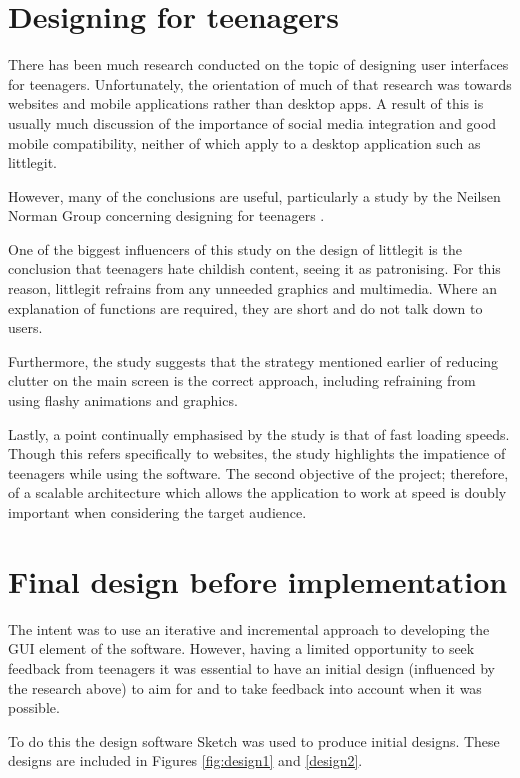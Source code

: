 \section {Designing for teenagers}\label{sec:teen-design}

There has been much research conducted on the topic of designing user interfaces for teenagers. Unfortunately, the orientation of much of that research was towards websites and mobile applications rather than desktop apps. A result of this is usually much discussion of the importance of social media integration and good mobile compatibility, neither of which apply to a desktop application such as littlegit.

However, many of the conclusions are useful, particularly a study by the Neilsen Norman Group concerning designing for teenagers \cite{teendesign}. 

One of the biggest influencers of this study on the design of littlegit is the conclusion that teenagers hate childish content, seeing it as patronising. For this reason, littlegit refrains from any unneeded graphics and multimedia. Where an explanation of functions are required, they are short and do not talk down to users.

Furthermore, the study suggests that the strategy mentioned earlier of reducing clutter on the main screen is the correct approach, including refraining from using flashy animations and graphics.

Lastly, a point continually emphasised by the study is that of fast loading speeds. Though this refers specifically to websites, the study highlights the impatience of teenagers while using the software.  The second objective of the project; therefore, of a scalable architecture which allows the application to work at speed is doubly important when considering the target audience.

\section{Final design before implementation}

The intent was to use an iterative and incremental approach to developing the GUI element of the software. However, having a limited opportunity to seek feedback from teenagers it was essential to have an initial design (influenced by the research above) to aim for and to take feedback into account when it was possible.

To do this the design software Sketch \cite{sketch,} was used to produce initial designs. These designs are included in Figures \ref{fig:design1} and \ref{design2}.





